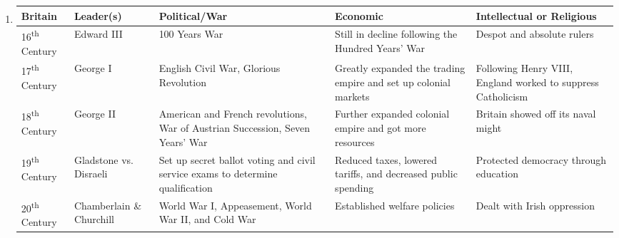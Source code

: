 \documentclass[12pt]{article}
\begin{document}
\begin{enumerate}
\begin{tabular}{p{} p{} p{} p{} p{}}
Italy & Leader(s) & Political/War & Economic & Intellectual or Religious \\
\hline
16\textsuperscript{th} Century & Wealthy Merchants or Bankers & Habsburg-Valois & Slave trade and regular trade is flourishing & The Reformation and High Renaissance \\
\hline
17\textsuperscript{th} Century & Phillip IV and Charles II & 30 Year War, Anglo-French War & Peasants were overburdened with taxation & Scientific Revolution  \\
\hline
18\textsuperscript{th} Century & Victor Emmanuel II & Crimean War & Cut government spending & Appeal to liberal and nationalists to rise up \\
\hline
19\textsuperscript{th} Century & Garibaldi, Cavour, and Mazzini & Wars to unite italy, Garibaldi takes Sicily, and Cavour takes northern Italy & Austria seizes rich merchant nations in the north & Social and cultural gap is widened \\
\hline
20\textsuperscript{th} Century & Victor Emmanuel III, Mussolini & World War I, World War II, Cold War, and a fascist regime & Welfare for workers is established & Fascist youth movement, expanded the military  \\

\end{tabular}

\item \begin{tabular}{p{} p{} p{} p{} p{}}

Britain & Leader(s) & Political/War & Economic & Intellectual or Religious \\
\hline
16\textsuperscript{th} Century & Edward III & 100 Years War & Still in decline following the Hundred Years' War & Despot and absolute rulers  \\
\hline
17\textsuperscript{th} Century & George I & English Civil War, Glorious Revolution & Greatly expanded the trading empire and set up colonial markets & Following Henry VIII, England worked to suppress Catholicism \\
\hline
18\textsuperscript{th} Century & George II & American and French revolutions, War of Austrian Succession, Seven Years' War & Further expanded colonial empire and got more resources & Britain showed off its naval might \\
\hline
19\textsuperscript{th} Century & Gladstone vs. Disraeli & Set up secret ballot voting and civil service exams to determine qualification & Reduced taxes, lowered tariffs, and decreased public spending & Protected democracy through education \\
\hline
20\textsuperscript{th} Century & Chamberlain \& Churchill & World War I, Appeasement, World War II, and Cold War & Established welfare policies & Dealt with Irish oppression  \\


\end{tabular}
\end{enumerate}
\end{document}
